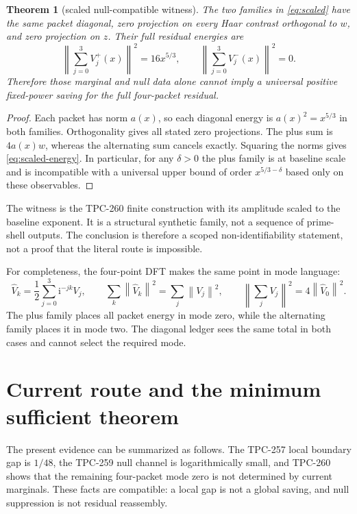 \documentclass[11pt]{article}
\newtheorem{theorem}{Theorem}
\theoremstyle{definition}
\newcommand{\norm}[1]{\left\lVert #1\right\rVert}
\newcommand{\ii}{\mathrm i}
\begin{document}
\begin{theorem}[scaled null-compatible witness]
The two families in \eqref{eq:scaled} have the same packet diagonal, zero
projection on every Haar contrast orthogonal to $w$, and zero projection on
$z$.  Their full residual energies are
\begin{equation}
 \left\|\sum_{j=0}^3V_j^+(x)\right\|^2=16x^{5/3},\qquad
 \left\|\sum_{j=0}^3V_j^-(x)\right\|^2=0.
 \label{eq:scaled-energy}
\end{equation}
Therefore those marginal and null data alone cannot imply a universal positive
fixed-power saving for the full four-packet residual.
\end{theorem}

\begin{proof}
Each packet has norm $a(x)$, so each diagonal energy is
$a(x)^2=x^{5/3}$ in both families.  Orthogonality gives all stated zero
projections.  The plus sum is $4a(x)w$, whereas the alternating sum cancels
exactly.  Squaring the norms gives \eqref{eq:scaled-energy}.  In particular,
for any $\delta>0$ the plus family is at baseline scale and is incompatible
with a universal upper bound of order $x^{5/3-\delta}$ based only on these
observables.  \end{proof}

The witness is the TPC-260 finite construction with its amplitude scaled to the
baseline exponent.  It is a structural synthetic family, not a sequence of
prime-shell outputs.  The conclusion is therefore a scoped non-identifiability
statement, not a proof that the literal route is impossible.

For completeness, the four-point DFT makes the same point in mode language:
\begin{equation}
 \widehat V_k=\frac12\sum_{j=0}^3\ii^{-jk}V_j,\qquad
 \sum_k\norm{\widehat V_k}^2=\sum_j\norm{V_j}^2,\qquad
 \norm{\sum_jV_j}^2=4\norm{\widehat V_0}^2.
 \label{eq:dft}
\end{equation}
The plus family places all packet energy in mode zero, while the alternating
family places it in mode two.  The diagonal ledger sees the same total in both
cases and cannot select the required mode.

\section{Current route and the minimum sufficient theorem}

The present evidence can be summarized as follows.  The TPC-257 local boundary
gap is $1/48$, the TPC-259 null channel is logarithmically small, and TPC-260
shows that the remaining four-packet mode zero is not determined by current
marginals.  These facts are compatible: a local gap is not a global saving, and
null suppression is not residual reassembly.
\end{document}
